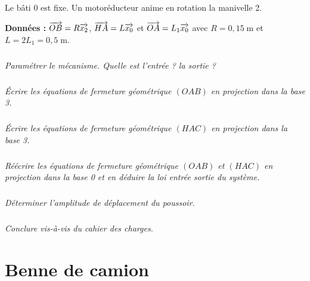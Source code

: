 \documentclass[10pt]{article}
\newif\ifprof
\begin{document}
Le bâti 0 est fixe. Un motoréducteur anime en rotation la manivelle 2.


\textbf{Données : } $\overrightarrow{OB}=R\overrightarrow{x_2}$, $\overrightarrow{HA}=L\overrightarrow{x_0}$ et $\overrightarrow{OA}=L_1\overrightarrow{x_0}$ avec $R=0,15 \;\text{m}$ et $L=2L_1=0,5\; \text{m}$.


\subparagraph{}
\textit{Paramétrer le mécanisme. Quelle est l'entrée ? la sortie ?}
\ifprof
\begin{corrige}
\end{corrige}
\else
\fi

\subparagraph{}
\textit{Écrire les équations de fermeture géométrique $(OAB)$ en projection dans la base 3. }
\ifprof
\begin{corrige}
\end{corrige}
\else
\fi

\subparagraph{}
\textit{Écrire les équations de fermeture géométrique $(HAC)$ en projection dans la base 3. }
\ifprof
\begin{corrige}
\end{corrige}
\else
\fi

\subparagraph{}
\textit{Réécrire les équations de fermeture géométrique $(OAB)$ et $(HAC)$ en projection dans la base 0 et en déduire la loi entrée sortie du système. }
\ifprof
\begin{corrige}
\end{corrige}
\else
\fi

\subparagraph{}
\textit{Déterminer l'amplitude de déplacement du poussoir.}
\ifprof
\begin{corrige}
\end{corrige}
\else
\fi


\subparagraph{}
\textit{Conclure vis-à-vis du cahier des charges.}
\ifprof
\begin{corrige}
\end{corrige}
\else
\fi


\section*{Benne de camion}
\setcounter{subparagraph}{0}
\end{document}
